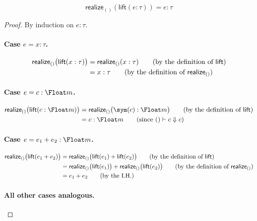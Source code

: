 \begin{lemma}\label{lem:realize-lift}
  \[
    \mathsf{realize}_{()}(\mathsf{lift}(e : \tau)) = e : \tau
  \]
\end{lemma}

\begin{proof}
  By induction on $e : \tau$. 

  \paragraph{Case $e=x:\tau$.}
  \begin{align*}
    \mathsf{realize}_{()}
    \bigl(\mathsf{lift}(x:\tau)\bigr)
    &=
    \mathsf{realize}_{()}(x:\tau)
    \tag{by the definition of $\mathsf{lift}$}
    \\
    &=
    x:\tau
    \tag{by the definition of $\mathsf{realize}_{()}$}
  \end{align*}

  \paragraph{Case $e=c:\Float m$.}
  \begin{align*}
    \mathsf{realize}_{()}
    \bigl(\mathsf{lift}(c:\Float m)\bigr)
    &=
    \mathsf{realize}_{()}
    \bigl(\sym(c):\Float m\bigr)
    \tag{by the definition of $\mathsf{lift}$}
    \\
    &=
    c:\Float m
    \tag{since $()\vdash c\Downarrow c$}
  \end{align*}

  \paragraph{Case $e=e_1+e_2:\Float m$.}
  \begin{align*}
    \mathsf{realize}_{()}
    \bigl(\mathsf{lift}(e_1+e_2)\bigr)
    &=
    \mathsf{realize}_{()}
    \bigl(
      \mathsf{lift}(e_1)+\mathsf{lift}(e_2)
    \bigr)
    \tag{by the definition of $\mathsf{lift}$}
    \\
    &=
    \mathsf{realize}_{()}
    \bigl(\mathsf{lift}(e_1)\bigr)
    +
    \mathsf{realize}_{()}
    \bigl(\mathsf{lift}(e_2)\bigr)
    \tag{by the definition of $\mathsf{realize}_{()}$}
    \\
    &=
    e_1+e_2
    \tag{by the I.H.}
  \end{align*}

  \paragraph{All other cases analogous.}
\end{proof}


